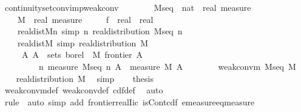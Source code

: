 \documentclass{article}
\theoremstyle{definition}
\begin{document}
\begin{isabellebody}
\isamarkupfalse%
\ continuity{\isacharunderscore}set{\isacharunderscore}conv{\isacharunderscore}imp{\isacharunderscore}weak{\isacharunderscore}conv{\isacharcolon}\isanewline
\ \ \ \isanewline
\ \ \ \ M{\isacharunderscore}seq\ {\isacharcolon}{\isacharcolon}\ {\isachardoublequoteopen}nat\ {\isasymRightarrow}\ real\ measure{\isachardoublequoteclose}\ \isanewline
\ \ \ \ M\ {\isacharcolon}{\isacharcolon}\ {\isachardoublequoteopen}real\ measure{\isachardoublequoteclose}\ \isanewline
\ \ \ \ f\ {\isacharcolon}{\isacharcolon}\ {\isachardoublequoteopen}real\ {\isasymRightarrow}\ real{\isachardoublequoteclose}\isanewline
\ \ \ \isanewline
\ \ \ \ real{\isacharunderscore}dist{\isacharunderscore}Mn\ {\isacharbrackleft}simp{\isacharbrackright}{\isacharcolon}\ {\isachardoublequoteopen}{\isasymAnd}n{\isachardot}\ real{\isacharunderscore}distribution\ {\isacharparenleft}M{\isacharunderscore}seq\ n{\isacharparenright}{\isachardoublequoteclose}\ \ \isanewline
\ \ \ \ real{\isacharunderscore}dist{\isacharunderscore}M\ {\isacharbrackleft}simp{\isacharbrackright}{\isacharcolon}\ {\isachardoublequoteopen}real{\isacharunderscore}distribution\ M{\isachardoublequoteclose}\ \ \isanewline
\ \ \ \ {\isacharasterisk}{\isacharcolon}\ {\isachardoublequoteopen}{\isasymAnd}A{\isachardot}\ A\ {\isasymin}\ sets\ borel\ {\isasymLongrightarrow}\ M\ {\isacharparenleft}frontier\ A{\isacharparenright}\ {\isacharequal}\ {}\ {\isasymLongrightarrow}\isanewline
\ \ \ \ \ \ \ \ {\isacharparenleft}{\isasymlambda}\ n{\isachardot}\ {\isacharparenleft}measure\ {\isacharparenleft}M{\isacharunderscore}seq\ n{\isacharparenright}\ A{\isacharparenright}{\isacharparenright}\ {\isacharminus}{\isacharminus}{\isacharminus}{\isacharminus}{\isachargreater}\ measure\ M\ A{\isachardoublequoteclose}\isanewline
\ \ \ \isanewline
\ \ \ \ {\isachardoublequoteopen}weak{\isacharunderscore}conv{\isacharunderscore}m\ M{\isacharunderscore}seq\ M{\isachardoublequoteclose}\isanewline
{}\isamarkupfalse%
\ {\isacharminus}\isanewline
\ \ \isamarkupfalse%
\ real{\isacharunderscore}distribution\ M\ \isamarkupfalse%
\ simp\isanewline
\ \ \isamarkupfalse%
\ {\isacharquery}thesis\isanewline
\ \ \ \isamarkupfalse%
\ weak{\isacharunderscore}conv{\isacharunderscore}m{\isacharunderscore}def\ weak{\isacharunderscore}conv{\isacharunderscore}def\ cdf{\isacharunderscore}def{}\ \isamarkupfalse%
\ auto\isanewline
\ \ \ \isamarkupfalse%
\ {\isacharparenleft}rule\ {\isacharasterisk}{\isacharcomma}\ auto\ simp\ add{\isacharcolon}\ frontier{\isacharunderscore}real{\isacharunderscore}Iic\ isCont{\isacharunderscore}cdf\ emeasure{\isacharunderscore}eq{\isacharunderscore}measure{\isacharparenright}\isanewline
{}\isamarkupfalse%
\end{isabellebody}
\end{document}
